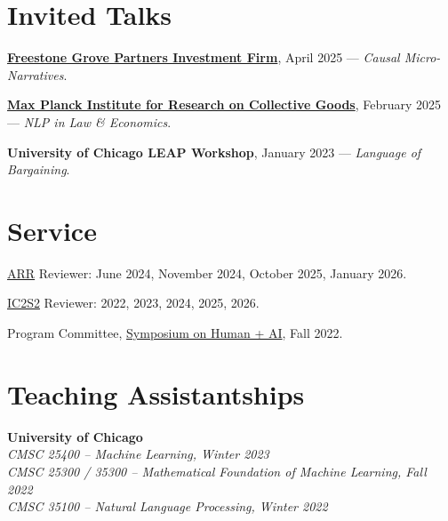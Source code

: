 \documentclass[11pt,letterpaper]{article}
\begin{document}
\section*{Invited Talks}
\begin{cvitems}

\item \href{https://fgrovep.com}{\textbf{Freestone Grove Partners Investment Firm}}, April 2025 --- \textit{Causal Micro-Narratives}.


\item \href{https://www.coll.mpg.de}{\textbf{Max Planck Institute for Research on Collective Goods}}, February 2025 --- \textit{NLP in Law \& Economics}.


\item \textbf{University of Chicago LEAP Workshop}, January 2023 --- \textit{Language of Bargaining}.

\end{cvitems}

\section*{Service}

\begin{cvitems}
    \item \href{https://aclrollingreview.org}{ARR} Reviewer: June 2024, November 2024, October 2025, January 2026.
    \item \href{https://ic2s2-2026.org}{IC2S2} Reviewer: 2022, 2023, 2024, 2025, 2026.
    \item Program Committee, \href{https://datascience.uchicago.edu/events/human-ai-conference/}{Symposium on Human + AI}, Fall 2022.
\end{cvitems}

\section*{Teaching Assistantships}

\textbf{University of Chicago}\\
\hspace*{2em}\textit{CMSC 25400 -- Machine Learning, Winter 2023}\\
\hspace*{2em}\textit{CMSC 25300 / 35300 -- Mathematical Foundation of Machine Learning, Fall 2022}\\
\hspace*{2em}\textit{CMSC 35100 -- Natural Language Processing, Winter 2022}
\end{document}
